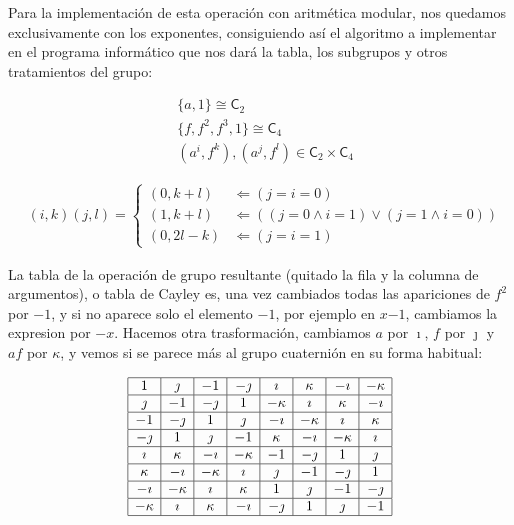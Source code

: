 \documentclass[12pt,a4paper,fleqn,spanish,final,openright]{extbook}
\theoremstyle{definition}
\theoremstyle{remark}
\begin{document}
	Para la implementación de esta operación con aritmética modular, nos quedamos exclusivamente con los exponentes, consiguiendo así el algoritmo a implementar en el programa informático que nos dará la tabla, los subgrupos y otros tratamientos del grupo:

\begin{align*}
&\{a,1\}   \cong   \mathsf{C}_{2}\\
&\{f,f^2,f^3,1\}   \cong   \mathsf{C}_{4}\\
&(a^i,f^k),(a^j,f^l)   \in \mathsf{C}_{2}   \times   \mathsf{C}_{4}
\end{align*}


\begin{align*}
&(i,k)(j,l)=
\begin{cases}
(0,k+l) &   \Leftarrow    {\left(j = i = 0\right)}\\
(1,k+l) &   \Leftarrow    {\left( (j = 0    \wedge    i=1)   \vee (j=1    \wedge    i=0) \right)}\\
(0,2l-k) &   \Leftarrow    {\left(j = i = 1\right)}
\end{cases}
\end{align*}


	La tabla de la operación de grupo resultante (quitado la fila y la columna de argumentos), o tabla de Cayley es, una vez cambiados todas las apariciones de $f^2$ por ${-1}$, y si no aparece solo el elemento ${-1}$, por ejemplo en $x{-1}$, cambiamos la expresion por ${-x}$. Hacemos otra trasformación, cambiamos $a$ por $\imath$, $f$ por $\jmath$ y $af$ por $\kappa$, y vemos si se parece más al grupo cuaternión en su forma habitual:


\begin{align*}
\begin{array}{|c|c|c|c|c|c|c|c|}
\hline
1&{\jmath}&{-1}&{-{\jmath}}&{\imath}&{\kappa }&{-{\imath}}&{-{\kappa }}\\
\hline
{\jmath}&{-1}&{-{\jmath}}&1&{-{\kappa }}&{\imath}&{\kappa }&{-{\imath}}\\
\hline
{-1}&{-{\jmath}}&1&{\jmath}&{-{\imath}}&{-{\kappa }}&{\imath}&{\kappa }\\
\hline
{-{\jmath}}&1&{\jmath}&{-1}&{\kappa }&{-{\imath}}&{-{\kappa }}&{\imath}\\
\hline
{\imath}&{\kappa }&{-{\imath}}&{-{\kappa }}&{-1}&{-{\jmath}}&1&{\jmath}\\
\hline
{\kappa }&{-{\imath}}&{-{\kappa }}&{\imath}&{\jmath}&{-1}&{-{\jmath}}&1\\
\hline
{-{\imath}}&{-{\kappa }}&{\imath}&{\kappa }&1&{\jmath}&{-1}&{-{\jmath}}\\
\hline
{-{\kappa }}&{\imath}&{\kappa }&{-{\imath}}&{-{\jmath}}&1&{\jmath}&{-1}\\
\hline
\end{array}
\end{align*}
\end{document}
